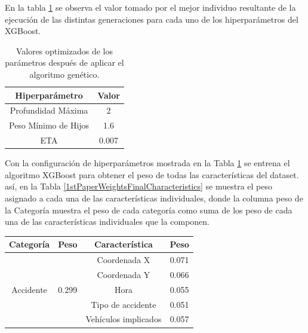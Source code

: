 \documentclass{uathesis-es}
\begin{document}
{En la tabla \ref{BestGASolutionTable} se observa el valor tomado por el mejor individuo resultante de la ejecución de las distintas generaciones para cada uno de los hiperparámetros del XGBoost. 

\begin{table}[h]
    \centering
    \begin{tabular}{ |c|c| } 
        \hline
        \textbf{Hiperparámetro} & \textbf{Valor}\\
        \hline
        Profundidad Máxima & 2 \\
        Peso Mínimo de Hijos & 1.6 \\ 
        ETA & 0.007 \\
        \hline
    \end{tabular}
    \caption{Valores optimizados de los parámetros después de aplicar el algoritmo genético.}
    \label{BestGASolutionTable}
\end{table}


Con la configuración de hiperparámetros mostrada en la Tabla \ref{BestGASolutionTable} se entrena el algoritmo XGBoost para obtener el peso de todas las  características del dataset. así, en la Tabla \ref{1stPaperWeightsFinalCharacteristics} se muestra el peso asignado a cada una de las características individuales, donde la columna peso de la Categoría muestra el peso de cada categoría como suma de los peso de cada una de las  características individuales que la componen.


\begin{table}[ht]
    \centering
    \begin{tabular}{ |c|c||c|c| }
        \hline
        \textbf{Categoría} & \textbf{Peso} & \textbf{Característica} & \textbf{Peso}\\
        \hline
        \hline
        \multirow{5}{*}{Accidente}   & \multirow{5}{*}{0.299} & Coordenada X & 0.071\\
        &  & Coordenada Y  & 0.066\\
        &  & Hora & 0.055\\
        &  & Tipo de accidente  & 0.051\\
        &  & Vehículos implicados & 0.057\\
        \hline
        

\end{tabular}
\end{table}}
\end{document}
